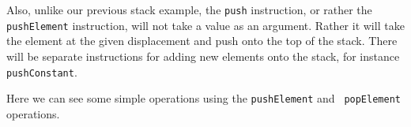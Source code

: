 Also, unlike our previous stack example, the {\tt push} instruction, or rather
the {\tt pushElement} instruction, will not take a value as an argument. Rather
it will take the element at the given displacement and push onto the top of the
stack. There will be separate instructions for adding new elements onto the
stack, for instance {\tt pushConstant}.

Here we can see some simple operations using the {\tt pushElement} and {\tt
  popElement} operations.
\begin{stackops}
\end{stackops}










